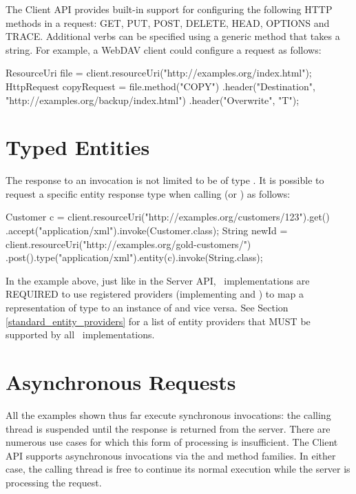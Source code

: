 The Client API provides built-in support for configuring the following HTTP methods in a request: GET, PUT, POST, DELETE, HEAD, OPTIONS and TRACE. Additional verbs can be specified using a generic method that takes a string. For example, a WebDAV client could configure a request as follows:

\begin{listing}{1}
ResourceUri file = client.resourceUri("http://examples.org/index.html");
HttpRequest copyRequest = file.method("COPY") 
    .header("Destination", "http://examples.org/backup/index.html")
    .header("Overwrite", "T");
\end{listing}

\section{Typed Entities}

The response to an invocation is not limited to be of type \HttpResponse. It is possible to request a specific entity response type when calling  (or ) as follows:

\begin{listing}{1}
Customer c = client.resourceUri("http://examples.org/customers/123").get()
    .accept("application/xml").invoke(Customer.class);
String newId = client.resourceUri("http://examples.org/gold-customers/")
    .post().type("application/xml").entity(c).invoke(String.class);
\end{listing}

In the example above, just like in the Server API, \jaxrs\ implementations are REQUIRED to use registered providers (implementing  and ) to map a representation of type  to an instance of  and vice versa. See Section \ref{standard_entity_providers} for a list of entity providers that MUST be supported by all \jaxrs\ implementations.

\section{Asynchronous Requests}

All the examples shown thus far execute synchronous invocations: the calling thread is suspended until the response is returned from the server. There are numerous use cases for which this form of processing is insufficient. The Client API supports asynchronous invocations via the  and  method families. In either case, the calling thread is free to continue its normal execution while the server is processing the request. 

